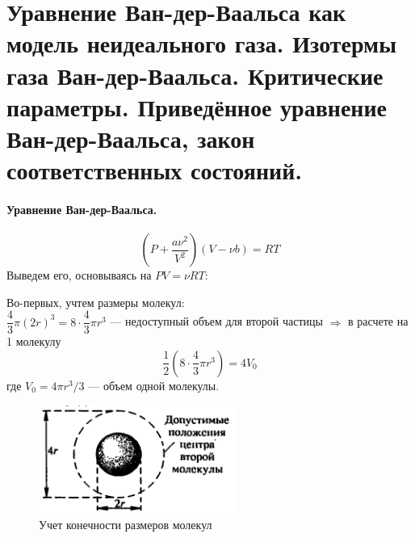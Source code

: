 \section{\normalsize Уравнение Ван-дер-Ваальса как модель неидеального газа. Изотермы газа Ван-дер-Ваальса. Критические параметры. Приведённое уравнение Ван-дер-Ваальса, закон соответственных состояний.}
\paragraph{Уравнение Ван-дер-Ваальса.}
$$\left(P+\dfrac{a\nu^2}{V^2}\right)\left(V-\nu b\right)=RT$$
Выведем его, основываясь на $PV=\nu RT$:\\
\begin{minipage}{100mm}
	Во-первых, учтем размеры молекул: \\$\dfrac{4}{3}\pi(2r)^3=8\cdot\dfrac{4}{3}\pi r^3$ --- недоступный объем для второй частицы $\Rightarrow$ в расчете на 1 молекулу $$\dfrac{1}{2}(8\cdot\dfrac{4}{3}\pi r^3)=4V_0$$
	где $V_0=4\pi r^3/3$ --- объем одной молекулы. 
\end{minipage}
\begin{minipage}{5mm}
	\quad
\end{minipage}
\begin{minipage}{65mm}
	\begin{figure}[H]
		\includegraphics[width=65mm]{ris19.png}
		\caption{Учет конечности размеров молекул}
	\end{figure}
\end{minipage}

